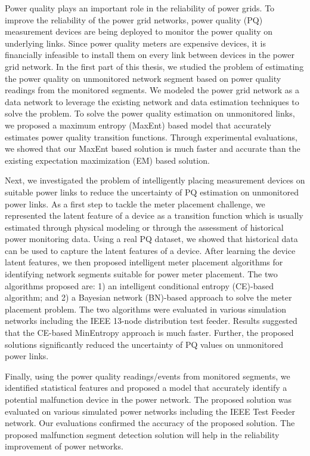 \documentclass[12pt,oneside]{book}
\begin{document}

\label{chap:conclusion}
Power quality plays an important role in the reliability of power grids. To improve the reliability of the power grid networks, power quality (PQ) measurement devices are being deployed to monitor the power quality on underlying links. Since power quality meters are expensive devices, it is financially infeasible to install them on every link between devices in the power grid network. In the first part of this thesis, we studied the problem of estimating the power quality on unmonitored network segment based on power quality readings from the monitored segments. We modeled the power grid network as a data network to leverage the existing network and data estimation techniques to solve the problem. To solve the power quality estimation on unmonitored links,  we proposed a maximum entropy (MaxEnt) based model that accurately estimates power quality transition functions. Through experimental evaluations, we showed that our MaxEnt based solution is much faster and accurate than the existing expectation maximization (EM) based solution.

Next, we investigated the problem of intelligently placing measurement devices on suitable power links to reduce the uncertainty of PQ estimation on unmonitored power links. As a first step to tackle the meter placement challenge, we represented the latent feature of a device as a transition function which is usually estimated through physical modeling or through the assessment of historical power monitoring data. Using a real PQ dataset, we showed that historical data can be used to capture the latent features of a device. After learning the device latent features, we then proposed intelligent meter placement algorithms for identifying network segments suitable for power meter placement. The two algorithms proposed are: 1)  an intelligent conditional entropy (CE)-based algorithm; and 2) a Bayesian network (BN)-based approach to solve the meter placement problem. The two algorithms were evaluated in various simulation networks including the IEEE 13-node distribution test feeder. Results suggested that the CE-based MinEntropy approach is much faster. Further, the proposed solutions significantly reduced the uncertainty of PQ values on unmonitored power links.

Finally, using the power quality readings/events from monitored segments, we identified statistical features and proposed a model that accurately identify a potential malfunction device in the power network. The proposed solution was evaluated on various simulated power networks including the IEEE Test Feeder network. Our evaluations confirmed the accuracy of the proposed solution. The proposed malfunction segment detection solution will help in the reliability improvement of power networks.
\end{document}
